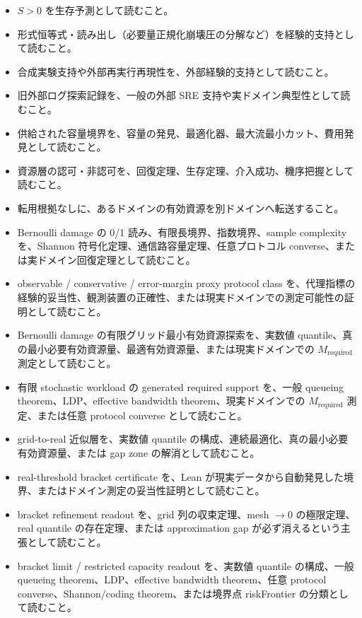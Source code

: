 \documentclass[12pt,a4paper]{article}
\begin{document}
\begin{itemize}
\tightlist
\item
  \(S>0\) を生存予測として読むこと。
\item
  形式恒等式・読み出し（必要量正規化崩壊圧の分解など）を経験的支持として読むこと。
\item
  合成実験支持や外部再実行再現性を、外部経験的支持として読むこと。
\item
  旧外部ログ探索記録を、一般の外部 SRE 支持や実ドメイン典型性として読むこと。
\item
  供給された容量境界を、容量の発見、最適化器、最大流最小カット、費用発見として読むこと。
\item
  資源層の認可・非認可を、回復定理、生存定理、介入成功、機序把握として読むこと。
\item
  転用根拠なしに、あるドメインの有効資源を別ドメインへ転送すること。
\item
  Bernoulli damage の 0/1 読み、有限長境界、指数境界、sample complexity を、Shannon 符号化定理、通信路容量定理、任意プロトコル converse、または実ドメイン回復定理として読むこと。
\item
  observable / conservative / error-margin proxy protocol class を、代理指標の経験的妥当性、観測装置の正確性、または現実ドメインでの測定可能性の証明として読むこと。
\item
  Bernoulli damage の有限グリッド最小有効資源探索を、実数値 quantile、真の最小必要有効資源量、最適有効資源量、または現実ドメインでの \(M_{\mathrm{required}}\) 測定として読むこと。
\item
  有限 stochastic workload の generated required support を、一般 queueing theorem、LDP、effective bandwidth theorem、現実ドメインでの \(M_{\mathrm{required}}\) 測定、または任意 protocol converse として読むこと。
\item
  grid-to-real 近似層を、実数値 quantile の構成、連続最適化、真の最小必要有効資源量、または gap zone の解消として読むこと。
\item
  real-threshold bracket certificate を、Lean が現実データから自動発見した境界、またはドメイン測定の妥当性証明として読むこと。
\item
  bracket refinement readout を、grid 列の収束定理、mesh \(\to 0\) の極限定理、real quantile の存在定理、または approximation gap が必ず消えるという主張として読むこと。
\item
  bracket limit / restricted capacity readout を、実数値 quantile の構成、一般 queueing theorem、LDP、effective bandwidth theorem、任意 protocol converse、Shannon/coding theorem、または境界点 riskFrontier の分類として読むこと。

\end{itemize}
\end{document}
